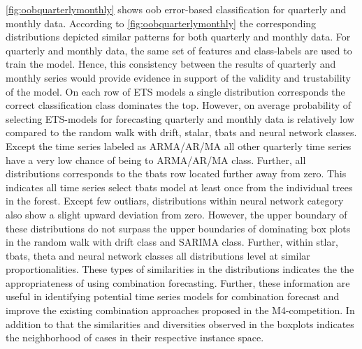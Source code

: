 \documentclass[11pt,a4paper,]{article}
\begin{document}
\autoref{fig:oobquarterlymonthly} shows oob error-based classification
for quarterly and monthly data. According to
\autoref{fig:oobquarterlymonthly} the corresponding distributions
depicted similar patterns for both quarterly and monthly data. For
quarterly and monthly data, the same set of features and class-labels
are used to train the model. Hence, this consistency between the results
of quarterly and monthly series would provide evidence in support of the
validity and trustability of the model. On each row of ETS models a
single distribution corresponds the correct classification class
dominates the top. However, on average probability of selecting
ETS-models for forecasting quarterly and monthly data is relatively low
compared to the random walk with drift, stalar, tbats and neural network
classes. Except the time series labeled as ARMA/AR/MA all other
quarterly time series have a very low chance of being to ARMA/AR/MA
class. Further, all distributions corresponds to the tbats row located
further away from zero. This indicates all time series select tbats
model at least once from the individual trees in the forest. Except few
outliars, distributions within neural network category also show a
slight upward deviation from zero. However, the upper boundary of these
distributions do not surpass the upper boundaries of dominating box
plots in the random walk with drift class and SARIMA class. Further,
within stlar, tbats, theta and neural network classes all distributions
level at similar proportionalities. These types of similarities in the
distributions indicates the the appropriateness of using combination
forecasting. Further, these information are useful in identifying
potential time series models for combination forecast and improve the
existing combination approaches proposed in the M4-competition. In
addition to that the similarities and diversities observed in the
boxplots indicates the neighborhood of cases in their respective
instance space.
\end{document}
